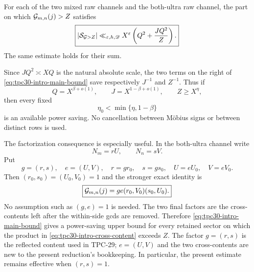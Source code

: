 \begin{theorem}
\label{thm:tpc30-intro-main}
For each of the two mixed raw channels and the both-ultra raw channel,
the part on which $\mathcal G_{m,n}(j)>Z$ satisfies
\begin{equation}
 \boxed{
 |\mathcal S_{\mathcal G>Z}|
 \ll_{\varepsilon,h,\mathscr D}X^\varepsilon
 \left(
 Q^2+\frac{JQ^2}{Z}
 \right).}
 \label{eq:tpc30-intro-main-bound}
\end{equation}
The same estimate holds for their sum.
\end{theorem}

Since $JQ^2\asymp XQ$ is the natural absolute scale, the two terms on
the right of \eqref{eq:tpc30-intro-main-bound} save respectively
$J^{-1}$ and $Z^{-1}$.  Thus if
\begin{equation}
 Q=X^{\beta+o(1)},\qquad
 J=X^{1-\beta+o(1)},\qquad
 Z\ge X^\eta,
 \label{eq:tpc30-intro-exponents}
\end{equation}
then every fixed
\begin{equation}
 \eta_0<\min\{\eta,1-\beta\}
 \label{eq:tpc30-intro-saving}
\end{equation}
is an available power saving.  No cancellation between M\"obius
signs or between distinct rows is used.

The factorization consequence is especially useful.  In the
both-ultra channel write
\begin{equation}
 N_m=rU,
 \qquad
 N_n=sV.
 \label{eq:tpc30-intro-factorizations}
\end{equation}
Put
\begin{equation}
 g=(r,s),\quad e=(U,V),\quad
 r=gr_0,\quad s=gs_0,\quad U=eU_0,\quad V=eV_0.
 \label{eq:tpc30-intro-primitive-factors}
\end{equation}
Then $(r_0,s_0)=(U_0,V_0)=1$ and the stronger exact identity is
\begin{equation}
 \boxed{
 \mathcal G_{m,n}(j)
 =ge(r_0,V_0)(s_0,U_0).}
 \label{eq:tpc30-intro-cross-content}
\end{equation}
No assumption such as $(g,e)=1$ is needed.  The two final factors are
the cross-contents left after the within-side gcds are removed.
Therefore \eqref{eq:tpc30-intro-main-bound} gives a power-saving upper
bound for every retained sector on which the product in
\eqref{eq:tpc30-intro-cross-content} exceeds $Z$.  The factor
$g=(r,s)$ is the reflected content used in TPC-29;
$e=(U,V)$ and the two cross-contents are new to the present reduction's
bookkeeping.  In particular, the
present estimate remains effective when $(r,s)=1$.

